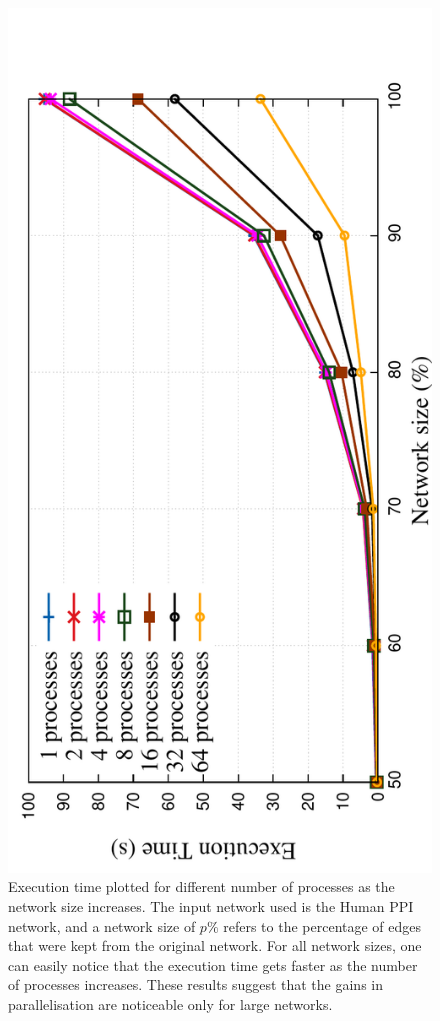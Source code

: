 \begin{figure}[H]
  \centering
\includegraphics[angle=-90,scale=0.6]{../code/final_results/parallelisation_results/problem_size_human_ppi2}
\caption[Parallelisation - Execution time as the network size increases]{Execution time plotted for different number of processes as the network size increases. The input network used is the Human PPI network, and a network size of $p\%$ refers to the percentage of edges that were kept from the original network. For all network sizes, one can easily notice that the execution time gets faster as the number of processes increases. These results suggest that the gains in parallelisation are noticeable only for large networks.}
\label{fig:problem_size}
\end{figure}

